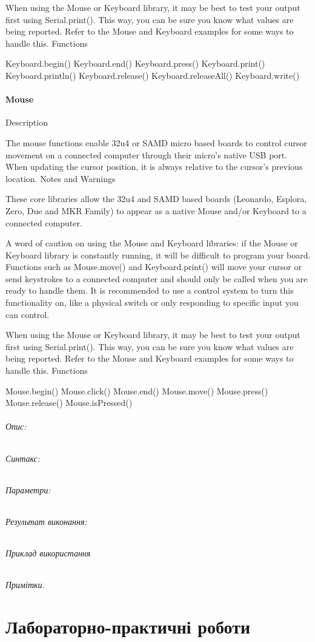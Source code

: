 \documentclass[12pt,a4paper]{report}  %
\begin{document}
When using the Mouse or Keyboard library, it may be best to test your output first using Serial.print(). This way, you can be sure you know what values are being reported. Refer to the Mouse and Keyboard examples for some ways to handle this.
Functions

Keyboard.begin()
Keyboard.end()
Keyboard.press()
Keyboard.print()
Keyboard.println()
Keyboard.release()
Keyboard.releaseAll()
Keyboard.write()
	
\subsubsection{Mouse}\label{Mouse} 

Description

The mouse functions enable 32u4 or SAMD micro based boards to control cursor movement on a connected computer through their micro’s native USB port. When updating the cursor position, it is always relative to the cursor’s previous location.
Notes and Warnings

These core libraries allow the 32u4 and SAMD based boards (Leonardo, Esplora, Zero, Due and MKR Family) to appear as a native Mouse and/or Keyboard to a connected computer.

A word of caution on using the Mouse and Keyboard libraries: if the Mouse or Keyboard library is constantly running, it will be difficult to program your board. Functions such as Mouse.move() and Keyboard.print() will move your cursor or send keystrokes to a connected computer and should only be called when you are ready to handle them. It is recommended to use a control system to turn this functionality on, like a physical switch or only responding to specific input you can control.

When using the Mouse or Keyboard library, it may be best to test your output first using Serial.print(). This way, you can be sure you know what values are being reported. Refer to the Mouse and Keyboard examples for some ways to handle this.
Functions

Mouse.begin()
Mouse.click()
Mouse.end()
Mouse.move()
Mouse.press()
Mouse.release()
Mouse.isPressed()

\subparagraph{Опис:}
\subparagraph{Синтакс:}
\subparagraph{Параметри:}
\subparagraph{Результат виконання:}
\subparagraph{Приклад використання}
\subparagraph{Примітки.}


\chapter{Лабораторно-практичні роботи}
\end{document}
